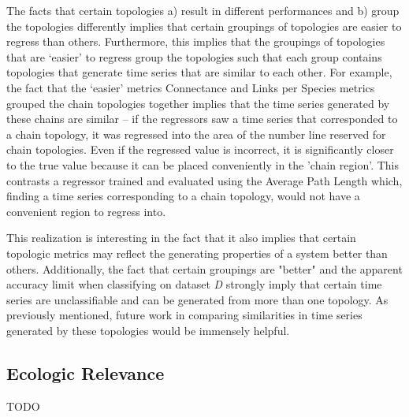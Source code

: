 \documentclass[letterpaper, 10 pt, conference]{ieeeconf}  %
\begin{document}
    The facts that certain topologies a) result in different performances and b) group the topologies differently implies that certain groupings of topologies are easier to regress than others. Furthermore, this implies that the groupings of topologies that are ‘easier’ to regress group the topologies such that each group contains topologies that generate time series that are similar to each other. For example, the fact that the ‘easier’ metrics Connectance and Links per Species metrics grouped the chain topologies together implies that the time series generated by these chains are similar – if the regressors saw a time series that corresponded to a chain topology, it was regressed into the area of the number line reserved for chain topologies. Even if the regressed value is incorrect, it is significantly closer to the true value because it can be placed conveniently in the 'chain region'.  This contrasts a regressor trained and evaluated using the Average Path Length which, finding a time series corresponding to a chain topology, would not have a convenient region to regress into. 

    This realization is interesting in the fact that it also implies that certain topologic metrics may reflect the generating properties of a system better than others. Additionally, the fact that certain groupings are "better" and the apparent accuracy limit when classifying on dataset \textit{D} strongly imply that certain time series are unclassifiable and can be generated from more than one topology. As previously mentioned, future work in comparing similarities in time series generated by these topologies would be immensely helpful.

\subsection{Ecologic Relevance}

    TODO
    

\end{document}
